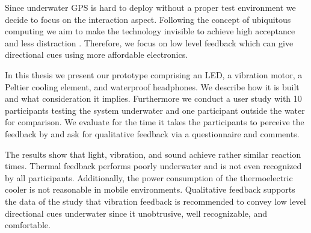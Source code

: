 Since underwater GPS is hard to deploy without a proper test environment we decide to focus on the interaction aspect.
Following the concept of ubiquitous computing we aim to make the technology invisible to achieve high acceptance and less distraction \citep{Weiser:1993:CSI:159544.159617}.
Therefore, we focus on low level feedback which can give directional cues using more affordable electronics.

In this thesis we present our prototype comprising an LED, a vibration motor, a Peltier cooling element, and waterproof headphones.
We describe how it is built and what consideration it implies.
Furthermore we conduct a user study with 10 participants testing the system underwater and one participant outside the water for comparison.
We evaluate for the time it takes the participants to perceive the feedback by and ask for qualitative feedback via a questionnaire and comments.

The results show that light, vibration, and sound achieve rather similar reaction times.
Thermal feedback performs poorly underwater and is not even recognized by all participants.
Additionally, the power consumption of the thermoelectric cooler is not reasonable in mobile environments.
Qualitative feedback supports the data of the study that vibration feedback is recommended to convey low level directional cues underwater since it unobtrusive, well recognizable, and comfortable.









